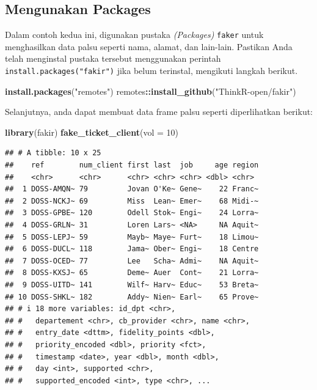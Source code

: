 \documentclass[
]{book}
\newenvironment{Shaded}{\begin{snugshade}}{\end{snugshade}}
\newcommand{\AttributeTok}[1]{\textcolor[rgb]{0.13,0.29,0.53}{#1}}
\newcommand{\DecValTok}[1]{\textcolor[rgb]{0.00,0.00,0.81}{#1}}
\newcommand{\FunctionTok}[1]{\textcolor[rgb]{0.13,0.29,0.53}{\textbf{#1}}}
\newcommand{\NormalTok}[1]{#1}
\newcommand{\SpecialCharTok}[1]{\textcolor[rgb]{0.81,0.36,0.00}{\textbf{#1}}}
\newcommand{\StringTok}[1]{\textcolor[rgb]{0.31,0.60,0.02}{#1}}
\begin{document}
\hypertarget{mengunakan-packages}{%
\subsection{Mengunakan Packages}\label{mengunakan-packages}}

Dalam contoh kedua ini, digunakan pustaka \emph{(Packages)} \texttt{faker} untuk menghasilkan data palsu seperti nama, alamat, dan lain-lain. Pastikan Anda telah menginstal pustaka tersebut menggunakan perintah \texttt{install.packages("fakir")} jika belum terinstal, mengikuti langkah berikut.

\begin{Shaded}
\begin{Highlighting}[]
\FunctionTok{install.packages}\NormalTok{(}\StringTok{"remotes"}\NormalTok{)}
\NormalTok{remotes}\SpecialCharTok{::}\FunctionTok{install\_github}\NormalTok{(}\StringTok{"ThinkR{-}open/fakir"}\NormalTok{)}
\end{Highlighting}
\end{Shaded}

Selanjutnya, anda dapat membuat data frame palsu seperti diperlihatkan berikut:

\begin{Shaded}
\begin{Highlighting}[]
\FunctionTok{library}\NormalTok{(fakir)}
\FunctionTok{fake\_ticket\_client}\NormalTok{(}\AttributeTok{vol =} \DecValTok{10}\NormalTok{)}
\end{Highlighting}
\end{Shaded}

\begin{verbatim}
## # A tibble: 10 x 25
##    ref        num_client first last  job     age region
##    <chr>      <chr>      <chr> <chr> <chr> <dbl> <chr> 
##  1 DOSS-AMQN~ 79         Jovan O'Ke~ Gene~    22 Franc~
##  2 DOSS-NCKJ~ 69         Miss  Lean~ Emer~    68 Midi-~
##  3 DOSS-GPBE~ 120        Odell Stok~ Engi~    24 Lorra~
##  4 DOSS-GRLN~ 31         Loren Lars~ <NA>     NA Aquit~
##  5 DOSS-LEPJ~ 59         Mayb~ Maye~ Furt~    18 Limou~
##  6 DOSS-DUCL~ 118        Jama~ Ober~ Engi~    18 Centre
##  7 DOSS-OCED~ 77         Lee   Scha~ Admi~    NA Aquit~
##  8 DOSS-KXSJ~ 65         Deme~ Auer  Cont~    21 Lorra~
##  9 DOSS-UITD~ 141        Wilf~ Harv~ Educ~    53 Breta~
## 10 DOSS-SHKL~ 182        Addy~ Nien~ Earl~    65 Prove~
## # i 18 more variables: id_dpt <chr>,
## #   departement <chr>, cb_provider <chr>, name <chr>,
## #   entry_date <dttm>, fidelity_points <dbl>,
## #   priority_encoded <dbl>, priority <fct>,
## #   timestamp <date>, year <dbl>, month <dbl>,
## #   day <int>, supported <chr>,
## #   supported_encoded <int>, type <chr>, ...
\end{verbatim}
\end{document}
